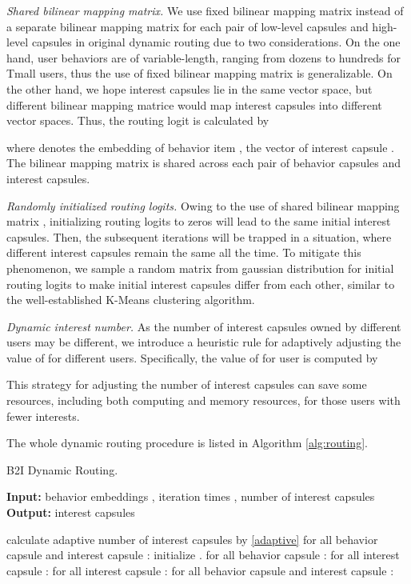 \documentclass[sigconf]{acmart}
\begin{document}
\textit{Shared bilinear mapping matrix.}
We use fixed bilinear mapping matrix  instead of a separate bilinear mapping matrix for each pair of low-level capsules and high-level capsules in original dynamic routing due to two considerations.
On the one hand, user behaviors are of variable-length, ranging from dozens to hundreds for Tmall users, thus the use of fixed bilinear mapping matrix is generalizable.
On the other hand, we hope interest capsules lie in the same vector space, but different bilinear mapping matrice would map interest capsules into different vector spaces.
Thus, the routing logit is calculated by

where  denotes the embedding of behavior item ,  the vector of interest capsule . The bilinear mapping matrix  is shared across each pair of behavior capsules and interest capsules.

\textit{Randomly initialized routing logits.}
Owing to the use of shared bilinear mapping matrix , initializing routing logits to zeros will lead to the same initial interest capsules.
Then, the subsequent iterations will be trapped in a situation, where different interest capsules remain the same all the time.
To mitigate this phenomenon, we sample a random matrix from gaussian distribution  for initial routing logits to make initial interest capsules differ from each other, similar to the well-established K-Means clustering algorithm.

\textit{Dynamic interest number.}
As the number of interest capsules owned by different users may be different, we introduce a heuristic rule for adaptively adjusting the value of  for different users.
Specifically, the value of  for user  is computed by


This strategy for adjusting the number of interest capsules can save some resources, including both computing and memory resources, for those users with fewer interests.

The whole dynamic routing procedure is listed in Algorithm \ref{alg:routing}.

\begin{algorithm}[htb]
\caption{B2I Dynamic Routing.}
\label{alg:routing}
\begin{flushleft}
\textbf{Input:} behavior embeddings , iteration times , number of interest capsules  \\
\textbf{Output:} interest capsules 
\end{flushleft}
\begin{algorithmic}[1]
\State calculate adaptive number of interest capsules  by \eqref{adaptive}
\State for all behavior capsule  and interest capsule : initialize .
\For {}
\State for all behavior capsule : 
\State for all interest capsule : 
\State for all interest capsule : 
\State for all behavior capsule  and interest capsule : 
\EndFor
\State \Return{}
\end{algorithmic}
\end{algorithm}
\end{document}
